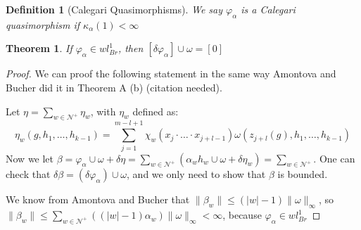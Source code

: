 \documentclass[leqno]{article}
\newtheorem*{theorem}{Theorem}
\newtheorem*{definition}{Definition}
\begin{document}
\begin{definition}[Calegari Quasimorphisms] We say $\varphi _\alpha $ is a Calegari quasimorphism if $\kappa_{\alpha }(1) < \infty$
\end{definition}

\begin{theorem} If $\varphi _\alpha \in wl^1_{Br}$, then $[\delta \varphi _\alpha ]\cup \omega =[0]$
\end{theorem}
\begin{proof}
We can proof the following statement in the same way Amontova and Bucher did it in Theorem A (b) (citation needed).

Let $\eta = \sum_{w\in \mathcal{N}^+}\eta_w$, with $\eta_w$ defined as:
\[
  \eta_w (g, h_1, \ldots, h_{k-1}) = \sum_{j=1}^{m-l+1} \chi _w (x_j\cdot \ldots\cdot x_{j+l-1})\omega (z_{j+l}(g), h_1, \ldots, h_{k-1})
\] 
Now we let $\beta = \varphi_\alpha \cup \omega +\delta \eta = \sum_{w\in \mathcal{N}^+}\left( \alpha _w h_w \cup \omega +\delta\eta_w \right) = \sum_{w\in \mathcal{N}^+}$. One can check that $\delta \beta = (\delta \varphi _\alpha )\cup \omega $, and we only need to show that $\beta $ is bounded.

We know from Amontova and Bucher that  $\|\beta _w\| \le (|w|-1)\|\omega \|_{\infty}$, so $\|\beta _w\|\le \sum_{w\in \mathcal{N}^+}((|w|-1)\alpha _w)\|\omega \|_{\infty}<\infty$, because $\varphi _\alpha \in wl^1_{Br}$
\end{proof}
\end{document}
